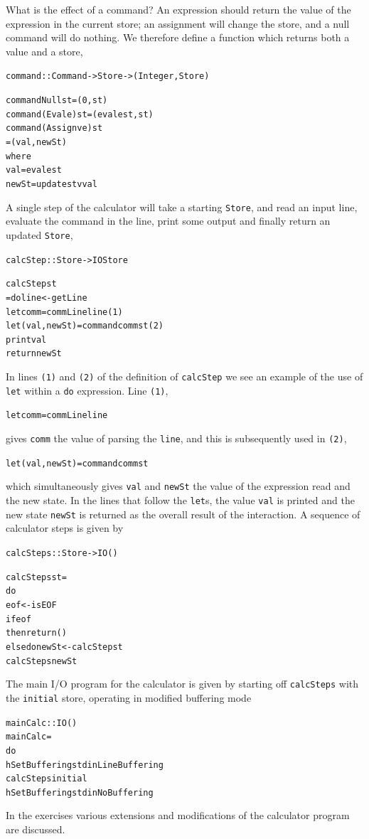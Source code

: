 What is the effect of a command? An expression should return the value
of the expression in the current store; an assignment will change the
store, and a null command will do nothing. We therefore define a
function which returns both a value and a store,
\begin{alltt}
command :: Command -> Store -> (Integer,Store)

command Null st     = (0 , st)
command (Eval e) st = (eval e st , st)
command (Assign v e) st 
  = (val , newSt)
    where
    val   = eval e st
    newSt = update st v val
\end{alltt}
A single step of the calculator will take a starting \texttt{Store}, and
read an input line, evaluate the command in the line, print some output
and finally return an updated \texttt{Store},
\begin{alltt}
calcStep :: Store -> IO Store

calcStep st
  = do line <- getLine
       let comm        = commLine line\hfill(1)
       let (val,newSt) = command comm st\hfill(2)
       print val
       return newSt
\end{alltt}
In lines \texttt{(1)} and \texttt{(2)}
of the definition of \texttt{calcStep} we see an example of the use
of \texttt{let} within a \texttt{do} expression. Line
\texttt{(1)},
\begin{alltt}
let comm        = commLine line
\end{alltt}
gives \texttt{comm} the value of parsing the \texttt{line}, and this is
subsequently used in \texttt{(2)},
\begin{alltt}
let (val,newSt) = command comm st
\end{alltt}
which simultaneously gives \texttt{val} and \texttt{newSt} the value of
the expression read and the new state. In the lines that
follow the \texttt{let}s, the value \texttt{val} is printed and the new state \texttt{newSt} is returned as the
overall result of the interaction. 
A sequence of calculator steps is given by
\begin{alltt}
calcSteps :: Store -> IO ()

calcSteps st =
    do
      eof <- isEOF
      if eof
         then return ()
         else do newSt <- calcStep st
                 calcSteps newSt
\end{alltt}
The main I/O program for the calculator is given by starting off
\texttt{calcSteps} with the \texttt{initial} store, operating in modified buffering mode
\begin{alltt}
mainCalc :: IO ()
mainCalc = 
    do
      hSetBuffering stdin LineBuffering
      calcSteps initial
      hSetBuffering stdin NoBuffering
\end{alltt}
In the exercises various extensions and modifications of the calculator
program are discussed.


